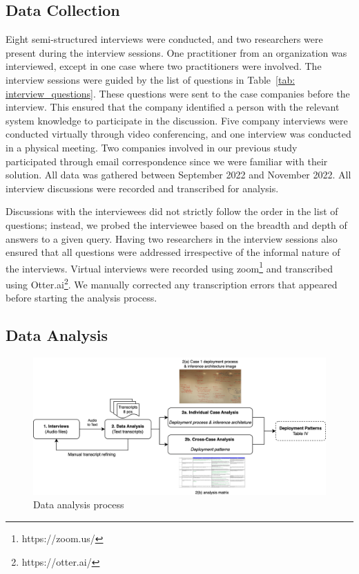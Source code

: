 \subsection{Data Collection}
Eight semi-structured interviews were conducted, and two researchers were present during the interview sessions. One practitioner from an organization was interviewed, except in one case where two practitioners were involved. The interview sessions were guided by the list of questions in Table~\ref{tab: interview_questions}. These questions were sent to the case companies before the interview. This ensured that the company identified a person with the relevant system knowledge to participate in the discussion. Five company interviews were conducted virtually through video conferencing, and one interview was conducted in a physical meeting. Two companies involved in our previous study~\cite{muiruri2022practices} participated through email correspondence since we were familiar with their solution. All data was gathered between September 2022 and November 2022. All interview discussions were recorded and transcribed for analysis.

Discussions with the interviewees did not strictly follow the order in the list of questions; instead, we probed the interviewee based on the breadth and depth of answers to a given query. Having two researchers in the interview sessions also ensured that all questions were addressed irrespective of the informal nature of the interviews. Virtual interviews were recorded using zoom\footnote{https://zoom.us/} and transcribed using Otter.ai\footnote{https://otter.ai/}. We manually corrected any transcription errors that appeared before starting the analysis process.

 
\subsection{Data Analysis}
\begin{figure}[b]
\centering
\includegraphics[width=\linewidth]{images/data_analysis_process.png}
\caption{Data analysis process}
\label{fig: data analysis process}
\end{figure}

